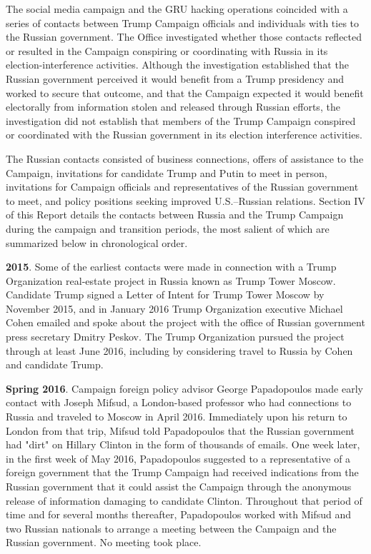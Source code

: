 The social media campaign and the GRU hacking operations coincided with a series of contacts between Trump Campaign officials and individuals with ties to the Russian government.
The Office investigated whether those contacts reflected or resulted in the Campaign conspiring or coordinating with Russia in its election-interference activities.
Although the investigation established that the Russian government perceived it would benefit from a Trump presidency and worked to secure that outcome, and that the Campaign expected it would benefit electorally from information stolen and released through Russian efforts, the investigation did not establish that members of the Trump Campaign conspired or coordinated with the Russian government in its election interference activities.

The Russian contacts consisted of business connections, offers of assistance to the Campaign, invitations for candidate Trump and Putin to meet in person, invitations for Campaign officials and representatives of the Russian government to meet, and policy positions seeking improved U.S.--Russian relations.
Section IV of this Report details the contacts between Russia and the Trump Campaign during the campaign and transition periods, the most salient of which are summarized below in chronological order.

\textbf{2015}.
Some of the earliest contacts were made in connection with a Trump Organization real-estate project in Russia known as Trump Tower Moscow.
Candidate Trump signed a Letter of Intent for Trump Tower Moscow by November 2015, and in January 2016 Trump Organization executive Michael Cohen emailed and spoke about the project with the office of Russian government press secretary Dmitry Peskov.
The Trump Organization pursued the project through at least June 2016, including by considering travel to Russia by Cohen and candidate Trump.

\textbf{Spring 2016}.
Campaign foreign policy advisor George Papadopoulos made early contact with Joseph Mifsud, a London-based professor who had connections to Russia and traveled to Moscow in April 2016.
Immediately upon his return to London from that trip, Mifsud told Papadopoulos that the Russian government had "dirt" on Hillary Clinton in the form of thousands of emails.
One week later, in the first week of May 2016, Papadopoulos suggested to a representative of a foreign government that the Trump Campaign had received indications from the Russian government that it could assist the Campaign through the anonymous release of information damaging to candidate Clinton.
Throughout that period of time and for several months thereafter, Papadopoulos worked with Mifsud and two Russian nationals to arrange a meeting between the Campaign and the Russian government.
No meeting took place.

